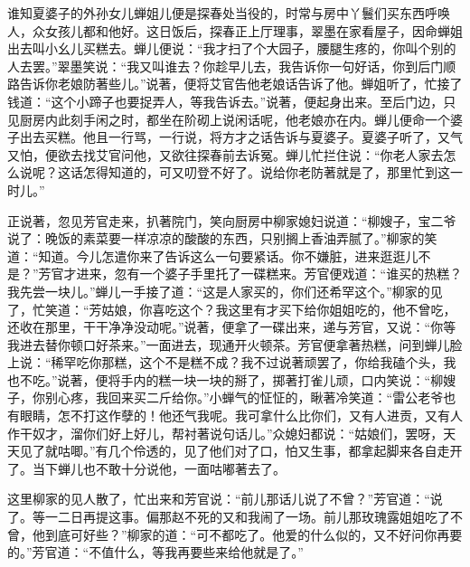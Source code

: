 \begin{parag}


    谁知夏婆子的外孙女儿蝉姐儿便是探春处当役的，时常与房中丫鬟们买东西呼唤人，众女孩儿都和他好。这日饭后，探春正上厅理事，翠墨在家看屋子，因命蝉姐出去叫小幺儿买糕去。蝉儿便说：“我才扫了个大园子，腰腿生疼的，你叫个别的人去罢。”翠墨笑说：“我又叫谁去？你趁早儿去，我告诉你一句好话，你到后门顺路告诉你老娘防著些儿。”说著，便将艾官告他老娘话告诉了他。蝉姐听了，忙接了钱道：“这个小蹄子也要捉弄人，等我告诉去。”说著，便起身出来。至后门边，只见厨房内此刻手闲之时，都坐在阶砌上说闲话呢，他老娘亦在内。蝉儿便命一个婆子出去买糕。他且一行骂，一行说，将方才之话告诉与夏婆子。夏婆子听了，又气又怕，便欲去找艾官问他，又欲往探春前去诉冤。蝉儿忙拦住说：“你老人家去怎么说呢？这话怎得知道的，可又叨登不好了。说给你老防著就是了，那里忙到这一时儿。”
\end{parag}


\begin{parag}


    正说著，忽见芳官走来，扒著院门，笑向厨房中柳家媳妇说道：“柳嫂子，宝二爷说了：晚饭的素菜要一样凉凉的酸酸的东西，只别搁上香油弄腻了。”柳家的笑道：“知道。今儿怎遣你来了告诉这么一句要紧话。你不嫌脏，进来逛逛儿不是？”芳官才进来，忽有一个婆子手里托了一碟糕来。芳官便戏道：“谁买的热糕？我先尝一块儿。”蝉儿一手接了道：“这是人家买的，你们还希罕这个。”柳家的见了，忙笑道：“芳姑娘，你喜吃这个？我这里有才买下给你姐姐吃的，他不曾吃，还收在那里，干干净净没动呢。”说著，便拿了一碟出来，递与芳官，又说：“你等我进去替你顿口好茶来。”一面进去，现通开火顿茶。芳官便拿著热糕，问到蝉儿脸上说：“稀罕吃你那糕，这个不是糕不成？我不过说著顽罢了，你给我磕个头，我也不吃。”说著，便将手内的糕一块一块的掰了，掷著打雀儿顽，口内笑说：“柳嫂子，你别心疼，我回来买二斤给你。”小蝉气的怔怔的，瞅著冷笑道：“雷公老爷也有眼睛，怎不打这作孽的！他还气我呢。我可拿什么比你们，又有人进贡，又有人作干奴才，溜你们好上好儿，帮衬著说句话儿。”众媳妇都说：“姑娘们，罢呀，天天见了就咕唧。”有几个伶透的，见了他们对了口，怕又生事，都拿起脚来各自走开了。当下蝉儿也不敢十分说他，一面咕嘟著去了。
\end{parag}


\begin{parag}


    这里柳家的见人散了，忙出来和芳官说：“前儿那话儿说了不曾？”芳官道：“说了。等一二日再提这事。偏那赵不死的又和我闹了一场。前儿那玫瑰露姐姐吃了不曾，他到底可好些？”柳家的道：“可不都吃了。他爱的什么似的，又不好问你再要的。”芳官道：“不值什么，等我再要些来给他就是了。”
\end{parag}


